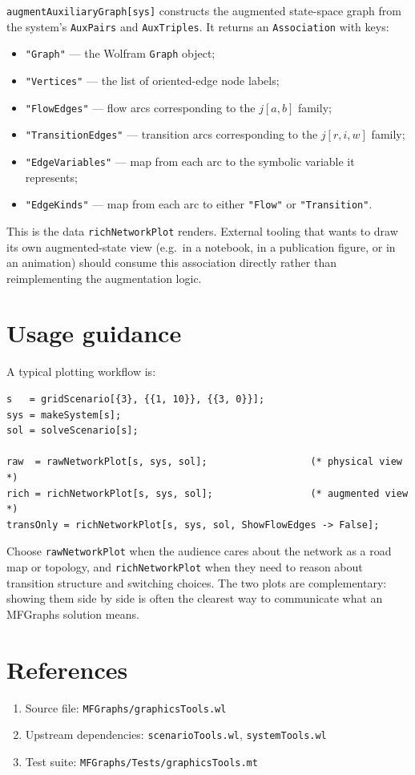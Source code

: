 \documentclass[11pt]{article}
\begin{document}
\texttt{augmentAuxiliaryGraph[sys]} constructs the augmented state-space graph from the system's \texttt{AuxPairs} and \texttt{AuxTriples}. It returns an \texttt{Association} with keys:
\begin{itemize}
\item \texttt{"Graph"} --- the Wolfram \texttt{Graph} object;
\item \texttt{"Vertices"} --- the list of oriented-edge node labels;
\item \texttt{"FlowEdges"} --- flow arcs corresponding to the $j[a, b]$ family;
\item \texttt{"TransitionEdges"} --- transition arcs corresponding to the $j[r, i, w]$ family;
\item \texttt{"EdgeVariables"} --- map from each arc to the symbolic variable it represents;
\item \texttt{"EdgeKinds"} --- map from each arc to either \texttt{"Flow"} or \texttt{"Transition"}.
\end{itemize}
This is the data \texttt{richNetworkPlot} renders. External tooling that wants to draw its own augmented-state view (e.g.\ in a notebook, in a publication figure, or in an animation) should consume this association directly rather than reimplementing the augmentation logic.

\section{Usage guidance}

A typical plotting workflow is:

\begin{verbatim}
s   = gridScenario[{3}, {{1, 10}}, {{3, 0}}];
sys = makeSystem[s];
sol = solveScenario[s];

raw  = rawNetworkPlot[s, sys, sol];                  (* physical view *)
rich = richNetworkPlot[s, sys, sol];                 (* augmented view *)
transOnly = richNetworkPlot[s, sys, sol, ShowFlowEdges -> False];
\end{verbatim}

Choose \texttt{rawNetworkPlot} when the audience cares about the network as a road map or topology, and \texttt{richNetworkPlot} when they need to reason about transition structure and switching choices. The two plots are complementary: showing them side by side is often the clearest way to communicate what an MFGraphs solution means.

\section*{References}

\begin{enumerate}
\item Source file: \texttt{MFGraphs/graphicsTools.wl}
\item Upstream dependencies: \texttt{scenarioTools.wl}, \texttt{systemTools.wl}
\item Test suite: \texttt{MFGraphs/Tests/graphicsTools.mt}
\end{enumerate}
\end{document}
